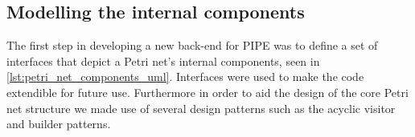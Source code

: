\subsection{Modelling the internal components}
The first step in developing a new back-end for PIPE was to define a set of interfaces that depict a Petri net's internal components, seen in \cref{lst:petri_net_components_uml}. Interfaces were used to make the code extendible for future use. Furthermore in order to aid the design of the core Petri net structure we made use of several design patterns such as the acyclic visitor and builder patterns.

